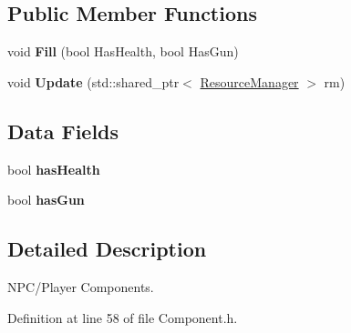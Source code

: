 \subsection*{Public Member Functions}
\begin{DoxyCompactItemize}
\item 
void {\bfseries Fill} (bool Has\+Health, bool Has\+Gun)\hypertarget{class_component_1_1_player_component_aea1500efda4a05a928bd23d76d47fdda}{}\label{class_component_1_1_player_component_aea1500efda4a05a928bd23d76d47fdda}

\item 
void {\bfseries Update} (std\+::shared\+\_\+ptr$<$ \hyperlink{class_resource_manager}{Resource\+Manager} $>$ rm)\hypertarget{class_component_1_1_player_component_a48b3a0653cebd15a14e248bbd71011bd}{}\label{class_component_1_1_player_component_a48b3a0653cebd15a14e248bbd71011bd}

\end{DoxyCompactItemize}
\subsection*{Data Fields}
\begin{DoxyCompactItemize}
\item 
bool {\bfseries has\+Health}\hypertarget{class_component_1_1_player_component_a6d4e5bf08368f2c1ece3ad0b27802dd6}{}\label{class_component_1_1_player_component_a6d4e5bf08368f2c1ece3ad0b27802dd6}

\item 
bool {\bfseries has\+Gun}\hypertarget{class_component_1_1_player_component_a5693dcedacbe16a46e930da841cc24d6}{}\label{class_component_1_1_player_component_a5693dcedacbe16a46e930da841cc24d6}

\end{DoxyCompactItemize}


\subsection{Detailed Description}
N\+P\+C/\+Player Components. 

Definition at line 58 of file Component.\+h.

